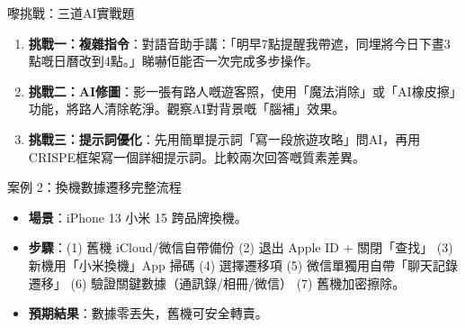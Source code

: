 \begin{tcbpractice}{嚟挑戰：三道AI實戰題}
\begin{enumerate}
  \item \textbf{挑戰一：複雜指令}：對語音助手講：「明早7點提醒我帶遮，同埋將今日下晝3點嘅日曆改到4點。」睇嚇佢能否一次完成多步操作。
  \item \textbf{挑戰二：AI修圖}：影一張有路人嘅遊客照，使用「魔法消除」或「AI橡皮擦」功能，將路人清除乾淨。觀察AI對背景嘅「腦補」效果。
  \item \textbf{挑戰三：提示詞優化}：先用簡單提示詞「寫一段旅遊攻略」問AI，再用CRISPE框架寫一個詳細提示詞。比較兩次回答嘅質素差異。
\end{enumerate}

\end{tcbpractice}

\begin{tcbinfo}{案例 2：換機數據遷移完整流程}
\begin{itemize}
  \item \textbf{場景}：iPhone 13 小米 15 跨品牌換機。
  \item \textbf{步驟}：(1) 舊機 iCloud/微信自帶備份 (2) 退出 Apple ID + 關閉「查找」 (3) 新機用「小米換機」App 掃碼 (4) 選擇遷移項 (5) 微信單獨用自帶「聊天記錄遷移」 (6) 驗證關鍵數據（通訊錄/相冊/微信） (7) 舊機加密擦除。
  \item \textbf{預期結果}：數據零丟失，舊機可安全轉賣。
\end{itemize}

\end{tcbinfo}
